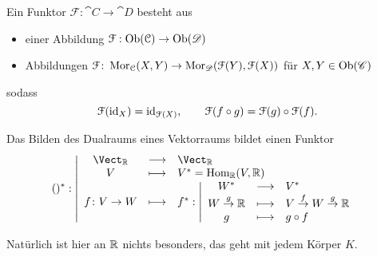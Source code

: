 \begin{definition}\label{def:kontravarianter-funktor}
   Ein  Funktor $\mathcal{F} : \cat{C} \to  \cat{D}$ besteht aus
   \begin{itemize}
       \item einer Abbildung $\mathcal{F}: \operatorname{Ob}(\mathcal{C}) \to  \operatorname{Ob}(\mathscr{D})$
       \item Abbildungen $\mathcal{F}\colon  \operatorname{Mor}_{\mathcal{C}}(X,Y) \to  \operatorname{Mor}_{\mathscr{D}}(\mathcal{F}(Y), \mathcal{F}(X))$ für $X,Y \in  \operatorname{Ob}(\mathscr{C})$
   \end{itemize}
   sodass
   \[
       \mathcal{F}(\mathrm{id}_X) = \mathrm{id}_{\mathcal{F}(X)}, \qquad \mathcal{F}(f \circ  g) = \mathcal{F} (g) \circ  \mathcal{F}(f)
   .\] 
\end{definition}

\begin{example}[Dualraum]
    Das Bilden des Dualraums eines Vektorraums bildet einen Funktor
        \begin{equation*}
            ()^* : \left| \begin{array}{c c l} 
        \Vect_{\R} & \longrightarrow & \Vect_{\R} \\
        V & \longmapsto &  V^*=\Hom_{\R}(V,\R) \\
        f\colon  V \to  W & \longmapsto & 
            f^*: \left| \begin{array}{c c l} 
            W^*  & \longrightarrow & V^* \\
            W\stackrel{g}{\to} \R & \longmapsto	 & V \stackrel{f}{\to }W \stackrel{g}{\to } \R \\
            g & \longmapsto & g \circ f
        \end{array} \right.
        
        \end{array} \right.
    \end{equation*}
\end{example}

\begin{remark*}
   Natürlich ist hier an $\mathbb{R}$ nichts besonders, das geht mit jedem Körper $K$. 
\end{remark*}

